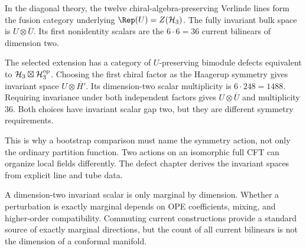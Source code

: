 In the diagonal theory, the twelve chiral-algebra-preserving
Verlinde lines form the fusion category underlying
$\Rep(U)=Z(\mathcal H_3)$. The fully invariant bulk space is
$U\otimes\overline U$. Its first nonidentity scalars are the
$6\cdot6=36$ current bilinears of dimension two.

The selected extension has a category of $U$-preserving bimodule
defects equivalent to
$\mathcal H_3\boxtimes\mathcal H_3^{\rm op}$.
Choosing the first chiral factor as the Haagerup symmetry gives
invariant space $U\otimes\overline{H'}$. Its dimension-two scalar
multiplicity is $6\cdot248=1488$. Requiring invariance under both
independent factors gives $U\otimes\overline U$ and multiplicity
$36$. Both choices have invariant scalar gap two, but they are
different symmetry requirements.

This is why a bootstrap comparison must name the symmetry action,
not only the ordinary partition function. Two actions on an
isomorphic full CFT can organize local fields differently. The
defect chapter derives the invariant spaces from explicit line
and tube data.

A dimension-two invariant scalar is only marginal by dimension.
Whether a perturbation is exactly marginal depends on OPE
coefficients, mixing, and higher-order compatibility. Commuting
current constructions provide a standard source of exactly
marginal directions, but the count of all current bilinears is
not the dimension of a conformal manifold.

